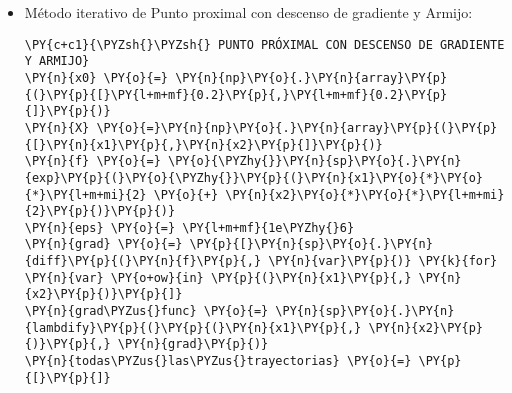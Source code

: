 \begin{itemize}
\item Método iterativo de Punto proximal con descenso de gradiente y Armijo:
\begin{tcolorbox}[breakable, size=fbox, boxrule=1pt, pad at break*=1mm,colback=cellbackground, colframe=cellborder]
\begin{Verbatim}[commandchars=\\\{\}]
\PY{c+c1}{\PYZsh{}\PYZsh{} PUNTO PRÓXIMAL CON DESCENSO DE GRADIENTE Y ARMIJO}
\PY{n}{x0} \PY{o}{=} \PY{n}{np}\PY{o}{.}\PY{n}{array}\PY{p}{(}\PY{p}{[}\PY{l+m+mf}{0.2}\PY{p}{,}\PY{l+m+mf}{0.2}\PY{p}{]}\PY{p}{)}
\PY{n}{X} \PY{o}{=}\PY{n}{np}\PY{o}{.}\PY{n}{array}\PY{p}{(}\PY{p}{[}\PY{n}{x1}\PY{p}{,}\PY{n}{x2}\PY{p}{]}\PY{p}{)}
\PY{n}{f} \PY{o}{=} \PY{o}{\PYZhy{}}\PY{n}{sp}\PY{o}{.}\PY{n}{exp}\PY{p}{(}\PY{o}{\PYZhy{}}\PY{p}{(}\PY{n}{x1}\PY{o}{*}\PY{o}{*}\PY{l+m+mi}{2} \PY{o}{+} \PY{n}{x2}\PY{o}{*}\PY{o}{*}\PY{l+m+mi}{2}\PY{p}{)}\PY{p}{)}
\PY{n}{eps} \PY{o}{=} \PY{l+m+mf}{1e\PYZhy{}6}
\PY{n}{grad} \PY{o}{=} \PY{p}{[}\PY{n}{sp}\PY{o}{.}\PY{n}{diff}\PY{p}{(}\PY{n}{f}\PY{p}{,} \PY{n}{var}\PY{p}{)} \PY{k}{for} \PY{n}{var} \PY{o+ow}{in} \PY{p}{(}\PY{n}{x1}\PY{p}{,} \PY{n}{x2}\PY{p}{)}\PY{p}{]}
\PY{n}{grad\PYZus{}func} \PY{o}{=} \PY{n}{sp}\PY{o}{.}\PY{n}{lambdify}\PY{p}{(}\PY{p}{(}\PY{n}{x1}\PY{p}{,} \PY{n}{x2}\PY{p}{)}\PY{p}{,} \PY{n}{grad}\PY{p}{)}
\PY{n}{todas\PYZus{}las\PYZus{}trayectorias} \PY{o}{=} \PY{p}{[}\PY{p}{]}


\end{Verbatim}
\end{tcolorbox}
\end{itemize}
